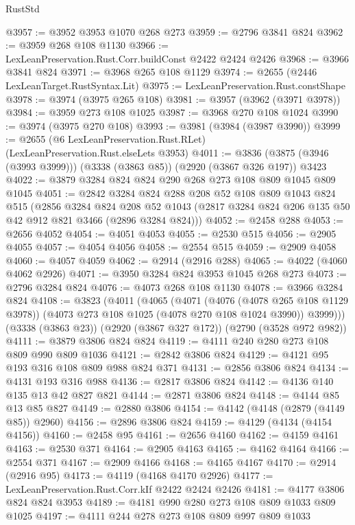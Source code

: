 \begin{lexlean}{RustStd}
\begin{coremodule}
@3957 := @3952 @3953 @1070 @268 @273
@3959 := @2796 @3841 @824
@3962 := @3959 @268 @108 @1130
@3966 := LexLeanPreservation.Rust.Corr.buildConst @2422 @2424 @2426
@3968 := @3966 @3841 @824
@3971 := @3968 @265 @108 @1129
@3974 := @2655 (@2446 LexLeanTarget.RustSyntax.Lit)
@3975 := LexLeanPreservation.Rust.constShape
@3978 := @3974 (@3975 @265 @108)
@3981 := @3957 (@3962 (@3971 @3978))
@3984 := @3959 @273 @108 @1025
@3987 := @3968 @270 @108 @1024
@3990 := @3974 (@3975 @270 @108)
@3993 := @3981 (@3984 (@3987 @3990))
@3999 := @2655 (@6 LexLeanPreservation.Rust.RLet) (LexLeanPreservation.Rust.elseLets @3953)
@4011 := @3836 (@3875 (@3946 (@3993 @3999))) (@3338 (@3863 @85)) (@2920 (@3867 @326 @197)) @3423
@4022 := @3879 @3284 @824 @824 @290 @268 @273 @108 @809 @1045 @809 @1045
@4051 := @2842
    @3284
    @824
    @288
    @208
    @52
    @108
    @809
    @1043
    @824
    @515
    (@2856
      @3284
      @824
      @208
      @52
      @1043
      (@2817 @3284 @824 @206 @135 @50 @42 @912 @821 @3466 (@2896 @3284 @824)))
@4052 := @2458 @288
@4053 := @2656 @4052
@4054 := @4051 @4053
@4055 := @2530 @515
@4056 := @2905 @4055
@4057 := @4054 @4056
@4058 := @2554 @515
@4059 := @2909 @4058
@4060 := @4057 @4059
@4062 := @2914 (@2916 @288)
@4065 := @4022 (@4060 @4062 @2926)
@4071 := @3950 @3284 @824 @3953 @1045 @268 @273
@4073 := @2796 @3284 @824
@4076 := @4073 @268 @108 @1130
@4078 := @3966 @3284 @824
@4108 := @3823
    (@4011
      (@4065
        (@4071
          (@4076 (@4078 @265 @108 @1129 @3978))
          (@4073 @273 @108 @1025 (@4078 @270 @108 @1024 @3990))
          @3999)))
    (@3338 (@3863 @23))
    (@2920 (@3867 @327 @172))
    (@2790 (@3528 @972 @982))
@4111 := @3879 @3806 @824 @824
@4119 := @4111 @240 @280 @273 @108 @809 @990 @809 @1036
@4121 := @2842 @3806 @824
@4129 := @4121 @95 @193 @316 @108 @809 @988 @824 @371
@4131 := @2856 @3806 @824
@4134 := @4131 @193 @316 @988
@4136 := @2817 @3806 @824
@4142 := @4136 @140 @135 @13 @42 @827 @821
@4144 := @2871 @3806 @824
@4148 := @4144 @85 @13 @85 @827
@4149 := @2880 @3806
@4154 := @4142 (@4148 (@2879 (@4149 @85)) @2960)
@4156 := @2896 @3806 @824
@4159 := @4129 (@4134 (@4154 @4156))
@4160 := @2458 @95
@4161 := @2656 @4160
@4162 := @4159 @4161
@4163 := @2530 @371
@4164 := @2905 @4163
@4165 := @4162 @4164
@4166 := @2554 @371
@4167 := @2909 @4166
@4168 := @4165 @4167
@4170 := @2914 (@2916 @95)
@4173 := @4119 (@4168 @4170 @2926)
@4177 := LexLeanPreservation.Rust.Corr.kIf @2422 @2424 @2426
@4181 := @4177 @3806 @824 @824 @3953
@4189 := @4181 @990 @280 @273 @108 @809 @1033 @809 @1025
@4197 := @4111 @244 @278 @273 @108 @809 @997 @809 @1033

\end{coremodule}
\end{lexlean}
